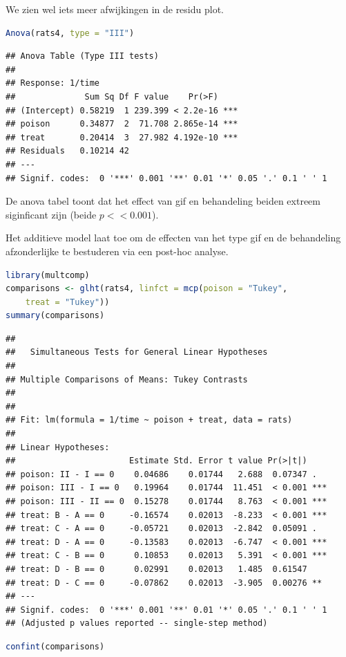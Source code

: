 \documentclass[
  12pt,dutch,coursenotes]{book}
\theoremstyle{definition}
\theoremstyle{definition}
\theoremstyle{definition}
\theoremstyle{definition}
\theoremstyle{remark}
\begin{document}
We zien wel iets meer afwijkingen in de residu plot.

\begin{lstlisting}[language=R]
Anova(rats4, type = "III")
\end{lstlisting}

\begin{lstlisting}
## Anova Table (Type III tests)
## 
## Response: 1/time
##              Sum Sq Df F value    Pr(>F)    
## (Intercept) 0.58219  1 239.399 < 2.2e-16 ***
## poison      0.34877  2  71.708 2.865e-14 ***
## treat       0.20414  3  27.982 4.192e-10 ***
## Residuals   0.10214 42                      
## ---
## Signif. codes:  0 '***' 0.001 '**' 0.01 '*' 0.05 '.' 0.1 ' ' 1
\end{lstlisting}

De anova tabel toont dat het effect van gif en behandeling beiden extreem siginficant zijn (beide \(p<< 0.001\)).

Het additieve model laat toe om de effecten van het type gif en de behandeling afzonderlijke te bestuderen via een post-hoc analyse.

\begin{lstlisting}[language=R]
library(multcomp)
comparisons <- glht(rats4, linfct = mcp(poison = "Tukey",
    treat = "Tukey"))
summary(comparisons)
\end{lstlisting}

\begin{lstlisting}
## 
##   Simultaneous Tests for General Linear Hypotheses
## 
## Multiple Comparisons of Means: Tukey Contrasts
## 
## 
## Fit: lm(formula = 1/time ~ poison + treat, data = rats)
## 
## Linear Hypotheses:
##                       Estimate Std. Error t value Pr(>|t|)    
## poison: II - I == 0    0.04686    0.01744   2.688  0.07347 .  
## poison: III - I == 0   0.19964    0.01744  11.451  < 0.001 ***
## poison: III - II == 0  0.15278    0.01744   8.763  < 0.001 ***
## treat: B - A == 0     -0.16574    0.02013  -8.233  < 0.001 ***
## treat: C - A == 0     -0.05721    0.02013  -2.842  0.05091 .  
## treat: D - A == 0     -0.13583    0.02013  -6.747  < 0.001 ***
## treat: C - B == 0      0.10853    0.02013   5.391  < 0.001 ***
## treat: D - B == 0      0.02991    0.02013   1.485  0.61547    
## treat: D - C == 0     -0.07862    0.02013  -3.905  0.00276 ** 
## ---
## Signif. codes:  0 '***' 0.001 '**' 0.01 '*' 0.05 '.' 0.1 ' ' 1
## (Adjusted p values reported -- single-step method)
\end{lstlisting}

\begin{lstlisting}[language=R]
confint(comparisons)
\end{lstlisting}
\end{document}
